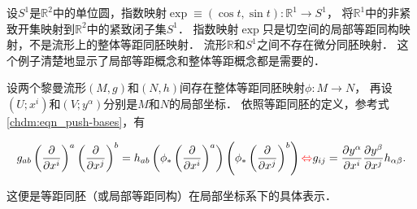 \begin{example}
    设$S^1$是$\mathbb{R}^2$中的单位圆，指数映射$\exp\equiv(\cos t, \sin t): \mathbb{R}^1 \to S^1$，
    将$\mathbb{R}^1$中的非紧致开集映射到$\mathbb{R}^2$中的紧致闭子集$S^1$．
    指数映射$\exp$只是切空间的局部等距同构映射，不是流形上的整体等距同胚映射．
    流形$\mathbb{R}$和$S^1$之间不存在微分同胚映射．
    这个例子清楚地显示了局部等距概念和整体等距概念都是需要的．
\end{example}

\begin{example}\label{chrg:exam_isometry-MNcoord}
    设两个黎曼流形$(M,g)$和$(N,h)$间存在整体等距同胚映射$\phi:M\to N$，
    再设$(U;x^i)$和$(V;y^\alpha)$分别是$M$和$N$的局部坐标．
    依照等距同胚的定义，参考式\eqref{chdm:eqn_push-bases}，有
    \begin{small}
    \setlength{\mathindent}{1em}
    \begin{equation}\label{chrg:eqn_isometry-MNcoord}
        g_{ab} \left(\frac{\partial }{\partial x^i}\right)^a
         \left(\frac{\partial }{\partial x^j}\right)^b = h_{ab}
        \left(\phi_{*} \left(\frac{\partial }{\partial x^i} \right)^a \right)
        \left(\phi_{*} \left(\frac{\partial }{\partial x^j} \right)^b \right)
        {\color{red} \Leftrightarrow }  g_{ij}=\frac{\partial y^\alpha}{\partial x^i}
        \frac{\partial y^\beta}{\partial x^j} h_{\alpha\beta} .
    \end{equation}\setlength{\mathindent}{2em}
    \end{small}
    这便是等距同胚（或局部等距同构）在局部坐标系下的具体表示．
\end{example}







